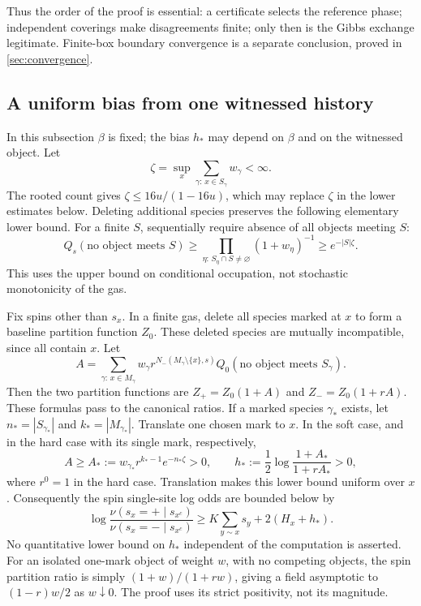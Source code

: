 \documentclass[11pt,reqno]{amsart}
\numberwithin{equation}{section}
\theoremstyle{definition}
\theoremstyle{remark}
\begin{document}
Thus the order of the proof is essential: a certificate selects the reference phase; independent coverings make disagreements finite; only then is the Gibbs exchange legitimate. Finite-box boundary convergence is a separate conclusion, proved in \cref{sec:convergence}.

\subsection{A uniform bias from one witnessed history}
In this subsection $\beta$ is fixed; the bias $h_*$ may depend on $\beta$ and on the witnessed object. Let
\[
 \zeta=\sup_x\sum_{\gamma:\,x\in S_\gamma}w_\gamma<\infty.
\]
The rooted count gives $\zeta\leq16u/(1-16u)$, which may replace $\zeta$ in the lower estimates below. Deleting additional species preserves the following elementary lower bound. For a finite $S$, sequentially require absence of all objects meeting $S$:
\begin{equation}\label{eq:vacancy}
 Q_s(\text{no object meets }S)
 \geq\prod_{\eta:\,S_\eta\cap S\ne\varnothing}(1+w_\eta)^{-1}
 \geq e^{-|S|\zeta}.
\end{equation}
This uses the upper bound on conditional occupation, not stochastic monotonicity of the gas.

Fix spins other than $s_x$. In a finite gas, delete all species marked at $x$ to form a baseline partition function $Z_0$. These deleted species are mutually incompatible, since all contain $x$. Let
\[
 A=\sum_{\gamma:\,x\in M_\gamma}w_\gamma
 r^{N_-(M_\gamma\setminus\{x\},s)}
 Q_0(\text{no object meets }S_\gamma).
\]
Then the two partition functions are $Z_+=Z_0(1+A)$ and $Z_-=Z_0(1+rA)$. These formulas pass to the canonical ratios. If a marked species $\gamma_*$ exists, let $n_*=|S_{\gamma_*}|$ and $k_*=|M_{\gamma_*}|$. Translate one chosen mark to $x$. In the soft case, and in the hard case with its single mark, respectively,
\begin{equation}\label{eq:hstar}
 A\geq A_*:=w_{\gamma_*}r^{k_*-1}e^{-n_*\zeta}>0,
 \qquad h_*:=\frac12\log\frac{1+A_*}{1+rA_*}>0,
\end{equation}
where $r^0=1$ in the hard case. Translation makes this lower bound uniform over $x$. Consequently the spin single-site log odds are bounded below by
\begin{equation}\label{eq:odds-lower}
 \log\frac{\nu(s_x=+\mid s_{x^c})}{\nu(s_x=-\mid s_{x^c})}
 \geq K\sum_{y\sim x}s_y+2(H_x+h_*).
\end{equation}
No quantitative lower bound on $h_*$ independent of the computation is asserted. For an isolated one-mark object of weight $w$, with no competing objects, the spin partition ratio is simply $(1+w)/(1+rw)$, giving a field asymptotic to $(1-r)w/2$ as $w\downarrow0$. The proof uses its strict positivity, not its magnitude.
\end{document}

